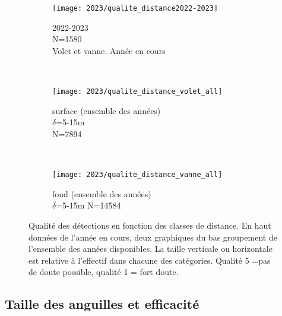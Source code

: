 \documentclass[11pt,twocolumn,titlepage,twoside]{article}
\begin{document}
\begin{figure}[htbp]
        \centering
        \begin{subfigure}{0.5\textwidth}
                \centering
                \texttt{[image: 2023/qualite\_distance2022-2023]}%
                \hspace*{25mm}\caption{\small 2022-2023 \\
                N=1580\\
                Volet et vanne. Année en cours}
                \label{/qualite_distance2022-2023}
       \end{subfigure}%
        \\
      \begin{subfigure}{0.45\textwidth}
                \centering
                \texttt{[image: 2023/qualite\_distance\_volet\_all]}%
               \hspace*{25mm} \caption{\small surface (ensemble des années) \\
                $\delta$=5-15m \\
                N=7894\\
               }
                \label{qualite_distance_volet_all}
        \end{subfigure}%
           \\
      \begin{subfigure}{0.45\textwidth}
                \centering
                \texttt{[image: 2023/qualite\_distance\_vanne\_all]}%
               \hspace*{25mm} \caption{\small fond (ensemble des années) \\
                $\delta$=5-15m N=14584
                }   
                \label{qualite_distance_vanne_all}
        \end{subfigure}
        \caption[Qualité.]{Qualité des détections en fonction des classes de
        distance. En haut données de l'année en cours, deux graphiques du bas
        groupement de l'ensemble des années disponibles. La taille verticale ou
        horizontale est relative à l'effectif dans chacune des catégories.
        Qualité 5 =pas de doute possible, qualité 1 = fort doute.}
       \label{qualite_distance}
\end{figure}

\subsection{Taille des anguilles et efficacité}\label{par_taille}
\end{document}
